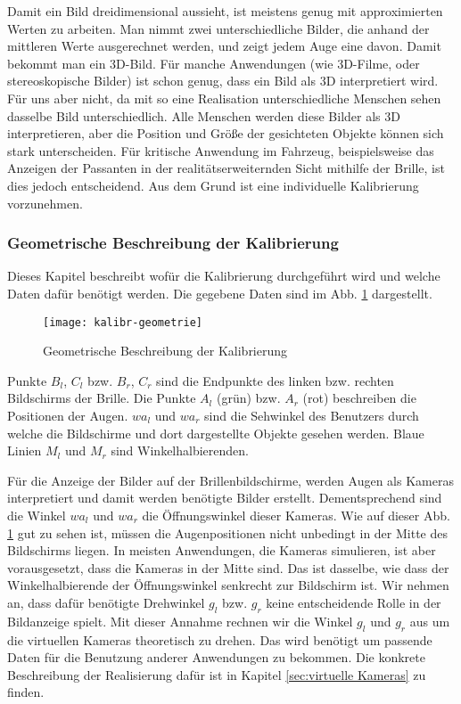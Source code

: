 Damit ein Bild dreidimensional aussieht, ist meistens genug mit approximierten Werten zu arbeiten.
Man nimmt zwei unterschiedliche Bilder, die anhand der mittleren Werte ausgerechnet werden, und zeigt jedem Auge eine davon. 
Damit bekommt man ein 3D-Bild. 
Für manche Anwendungen (wie 3D-Filme, oder stereoskopische Bilder) ist schon genug,  dass ein Bild als 3D interpretiert wird. 
Für uns aber nicht, da mit so eine Realisation unterschiedliche Menschen sehen dasselbe Bild unterschiedlich.
Alle Menschen werden diese Bilder als 3D interpretieren, aber die Position und Größe der gesichteten Objekte können sich stark unterscheiden. Für kritische Anwendung im Fahrzeug, beispielsweise das Anzeigen der Passanten in der realitätserweiternden Sicht mithilfe der Brille, ist dies jedoch entscheidend. Aus dem Grund ist eine individuelle Kalibrierung vorzunehmen.


\subsubsection{Geometrische Beschreibung der Kalibrierung}
\label{sec:Geometrische Beschreibung der Kalibrierung}
Dieses Kapitel beschreibt wofür die Kalibrierung durchgeführt wird und welche Daten dafür benötigt werden.
Die gegebene Daten sind im Abb. \ref{fig:geom} dargestellt. 

\begin{figure}[h]
   \centering
   \texttt{[image: kalibr-geometrie]}
   \caption{Geometrische Beschreibung der Kalibrierung}
   \label{fig:geom}
\end{figure}

Punkte $B_{l}$, $C_{l}$ bzw. $B_{r}$, $C_{r}$ sind die Endpunkte des linken bzw. rechten Bildschirms der Brille.
Die Punkte $A_{l}$ (grün) bzw. $A_{r}$ (rot) beschreiben die Positionen der Augen.
$wa_{l}$ und $wa_{r}$ sind die Sehwinkel des Benutzers durch welche die Bildschirme und dort dargestellte Objekte gesehen werden. 
Blaue Linien $M_{l}$ und $M_{r}$ sind Winkelhalbierenden.

Für die Anzeige der Bilder auf der Brillenbildschirme, werden Augen als Kameras interpretiert und damit werden benötigte Bilder erstellt.
Dementsprechend sind die Winkel $wa_{l}$ und $wa_{r}$ die Öffnungswinkel dieser Kameras.
Wie auf dieser Abb. \ref{fig:geom} gut zu sehen ist, müssen die Augenpositionen nicht unbedingt in der Mitte des Bildschirms liegen.
In meisten Anwendungen, die Kameras simulieren, ist aber vorausgesetzt, dass die Kameras in der Mitte sind.
Das ist dasselbe, wie dass der Winkelhalbierende der Öffnungswinkel senkrecht zur Bildschirm ist.
Wir nehmen an, dass dafür benötigte Drehwinkel $g_{l}$ bzw. $g_{r}$ keine entscheidende Rolle in der Bildanzeige spielt.
Mit dieser Annahme rechnen wir die Winkel $g_{l}$ und  $g_{r}$ aus  um die virtuellen Kameras theoretisch zu drehen.
Das wird benötigt um passende Daten für die Benutzung anderer Anwendungen zu bekommen. Die konkrete Beschreibung der Realisierung dafür ist in Kapitel  \ref{sec:virtuelle Kameras} zu finden.

